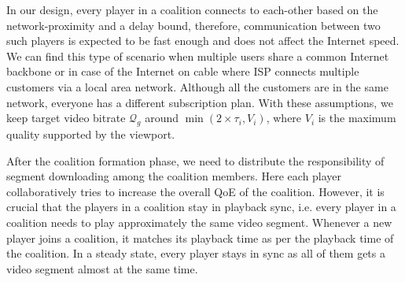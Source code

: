 In our design, every player in a coalition connects to each-other based on the network-proximity and a delay bound, therefore, communication between two such players is expected to be fast enough and does not affect the Internet speed. We can find this type of scenario when multiple users share a common Internet backbone or in case of the Internet on cable where ISP connects multiple customers via a local area network. Although all the customers are in the same network, everyone has a different subscription plan. With these assumptions, we keep target video bitrate $\mathcal{Q}_g$ around $\min(2\times\tau_i, V_i)$, where $V_i$ is the maximum quality supported by the viewport. 

After the coalition formation phase, we need to distribute the responsibility of segment downloading among the coalition members. Here each player collaboratively tries to increase the overall QoE of the coalition. However, it is crucial that the players in a coalition stay in playback sync, i.e. every player in a coalition needs to play approximately the same video segment. Whenever a new player joins a coalition, it matches its playback time as per the playback time of the coalition. In a steady state, every player stays in sync as all of them gets a video segment almost at the same time.

